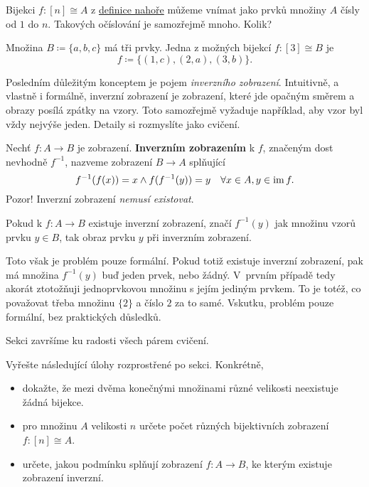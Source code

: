 Bijekci $f:[n] \cong A$ z \hyperref[def:velikost-mnoziny-poradne]{definice
nahoře} můžeme vnímat jako  prvků množiny $A$ čísly od $1$ do
$n$. Takových očíslování je samozřejmě mnoho. Kolik?

\begin{example}
 Množina $B \coloneqq \{a,b,c\}$ má tři prvky. Jedna z možných bijekcí ${f:[3]
 \cong B}$ je
 \[
  f \coloneqq \{(1,c),(2,a),(3,b)\}.
 \]
\end{example}

Posledním důležitým konceptem je pojem \emph{inverzního zobrazení}. Intuitivně,
a vlastně i formálně, inverzní zobrazení je zobrazení, které jde opačným směrem
a obrazy posílá zpátky na vzory. Toto samozřejmě vyžaduje například, aby vzor
byl vždy nejvýše jeden. Detaily si rozmyslíte jako cvičení.

\begin{definition}
 Nechť $f:A \to B$ je zobrazení. \textbf{Inverzním zobrazením} k $f$, značeným
 dost nevhodně $f^{-1}$, nazveme zobrazení $B \to A$ splňující
 \[
  f^{-1}(f(x)) = x \wedge f(f^{-1}(y)) = y \quad  \forall x \in A,y \in \operatorname{im} f.
 \]
 Pozor! Inverzní zobrazení \emph{nemusí existovat}.
\end{definition}

\begin{warning}
 Pokud k $f:A \to B$ existuje inverzní zobrazení, značí $f^{-1}(y)$ jak množinu
 vzorů prvku $y \in B$, tak obraz prvku $y$ při inverzním zobrazení.

 Toto však je problém pouze formální. Pokud totiž existuje inverzní zobrazení,
 pak má množina $f^{-1}(y)$ buď jeden prvek, nebo žádný. V~prvním případě tedy
 akorát ztotožňuji jednoprvkovou množinu s jejím jediným prvkem. To je totéž, co
 považovat třeba množinu $\{2\}$ a číslo $2$ za to samé. Vskutku, problém pouze
 formální, bez praktických důsledků.
\end{warning}

Sekci završíme ku radosti všech párem cvičení.

\begin{exercise}
 Vyřešte následující úlohy rozprostřené po sekci. Konkrétně,
 \begin{itemize}
  \item dokažte, že mezi dvěma konečnými množinami různé velikosti neexistuje
   žádná bijekce.
  \item pro množinu $A$ velikosti $n$ určete počet různých bijektivních
   zobrazení ${f:[n]
   \cong A}$.
  \item určete, jakou podmínku splňují zobrazení $f:A \to B$, ke kterým existuje
   zobrazení inverzní.
 \end{itemize}
\end{exercise}

